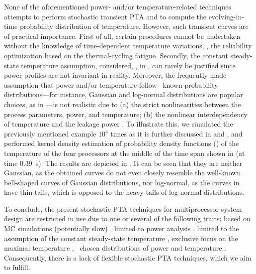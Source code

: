 
None of the aforementioned power- and/or temperature-related techniques attempts to perform stochastic transient PTA and to compute the evolving-in-time probability distribution of temperature.
However, such transient curves are of practical importance.
First of all, certain procedures cannot be undertaken without the knowledge of time-dependent temperature variations, \eg, the reliability optimization based on the thermal-cycling fatigue. Secondly, the constant steady-state temperature assumption, considered, \eg, in \cite{juan2011, juan2012}, can rarely be justified since power profiles are not invariant in reality.
Moreover, the frequently made assumption that power and/or temperature follow \apriori\ known probability distributions---for instance, Gaussian and log-normal distributions are popular choices, as in \cite{srivastava2010, juan2012, bhardwaj2006}---is not realistic due to (a) the strict nonlinearities between the process parameters, power, and temperature; (b) the nonlinear interdependency of temperature and the leakage power \cite{liu2007}.
To illustrate this, we simulated the previously mentioned example $10^4$ times as it is further discussed in  and , and performed kernel density estimation of probability density functions (\pdfs) of the temperature of the four processors at the middle of the time span shown in  (at time 0.39~s).
The results are depicted in . It can be seen that they are neither Gaussian, as the obtained curves do not even closely resemble the well-known bell-shaped curves of Gaussian distributions, nor log-normal, as the curves in  have thin tails, which is opposed to the heavy tails of log-normal distributions.

To conclude, the present stochastic PTA techniques for multiprocessor system design are restricted in use due to one or several of the following traits: based on MC simulations (potentially slow) \cite{chandra2010}, limited to power analysis \cite{chandra2010, shen2009, bhardwaj2006, ghanta2006}, limited to the assumption of the constant steady-state temperature \cite{juan2011, juan2012}, exclusive focus on the maximal temperature \cite{juan2011}, \apriori\ chosen distributions of power and temperature \cite{srivastava2010, juan2012, bhardwaj2006}.
Consequently, there is a lack of flexible stochastic PTA techniques, which we aim to fulfill.
